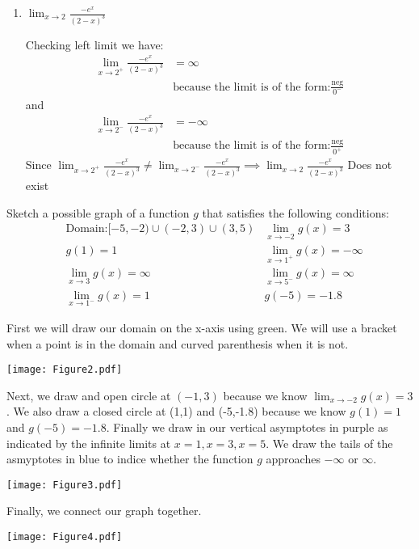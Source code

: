 \documentclass[nooutcomes]{ximera}
\begin{document}
\begin{problem}
\begin{enumerate}
    \item
      $\displaystyle \lim_{x \to 2} \frac{-e^x}{(2-x)^3}$
      \begin{freeResponse}
        Checking left limit we have:
 \begin{align*}
          \lim_{x \to 2^+} \frac{-e^x}{(2-x)^3} &= \infty\\
	&\text{because the limit is of the form:} \frac{\text{neg}}{0^-}
        \end{align*}
 	 and
        \begin{align*}
 	\lim_{x \to 2^-} \frac{-e^x}{(2-x)^3} &= - \infty\\
	&\text{because the limit is of the form:} \frac{\text{neg}}{0^+}
	\end{align*}
	Since $ \lim_{x \to 2^+} \frac{-e^x}{(2-x)^3} \ne \lim_{x \to 2^-} \frac{-e^x}{(2-x)^3} \implies   \lim_{x \to 2} \frac{-e^x}{(2-x)^3}$ Does not exist
      \end{freeResponse}
\end{enumerate}
\end{problem}

\begin{problem}
	Sketch a possible graph of a function $g$ that satisfies the following conditions:
	\begin{align*}
	&\text{Domain:} [-5,-2) \cup (-2,3) \cup (3,5)
	& \lim_{x \to -2} g(x) = 3\\
	& g(1)=1
	& \lim_{x \to 1^+} g(x) = -\infty\\
	& \lim_{x \to 3} g(x) = \infty
	& \lim_{x \to 5^-} g(x) = \infty\\
	& \lim_{x \to 1^-} g(x) = 1
	& g(-5)=-1.8
	\end{align*}
	\begin{freeResponse}
	First we will draw our domain on the x-axis using green.  We will use a bracket when a point is in the domain and curved parenthesis when it is not.
  \begin{center}
    \texttt{[image: Figure2.pdf]}
  \end{center}
	Next, we draw and open circle at $(-1,3)$ because we know $\lim_{x \to -2} g(x) = 3$.  We also draw a closed circle at (1,1) and (-5,-1.8) because we know $g(1)=1$ and $g(-5)=-1.8$.  Finally we draw in our vertical asymptotes in purple as indicated by the infinite limits at $x=1, x=3, x=5$.  We draw the tails of the asmyptotes in blue to indice whether the function $g$ approaches $ -\infty$ or $\infty$.
  \begin{center}
    \texttt{[image: Figure3.pdf]}
  \end{center}
	Finally, we connect our graph together.
  \begin{center}
    \texttt{[image: Figure4.pdf]}
  \end{center}
	\end{freeResponse}
\end{problem}
\end{document}
